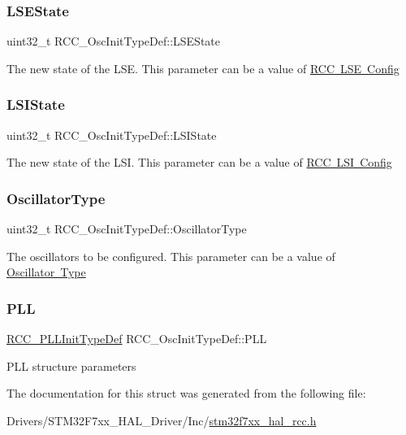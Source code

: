 \subsubsection{\texorpdfstring{LSEState}{LSEState}}
{\footnotesize\ttfamily uint32\+\_\+t R\+C\+C\+\_\+\+Osc\+Init\+Type\+Def\+::\+L\+S\+E\+State}

The new state of the L\+SE. This parameter can be a value of \mbox{\hyperlink{group___r_c_c___l_s_e___config}{R\+CC L\+SE Config}} \mbox{\label{struct_r_c_c___osc_init_type_def_a955de90db8882fde02c4fb59c7c000f0}} 
\subsubsection{\texorpdfstring{LSIState}{LSIState}}
{\footnotesize\ttfamily uint32\+\_\+t R\+C\+C\+\_\+\+Osc\+Init\+Type\+Def\+::\+L\+S\+I\+State}

The new state of the L\+SI. This parameter can be a value of \mbox{\hyperlink{group___r_c_c___l_s_i___config}{R\+CC L\+SI Config}} \mbox{\label{struct_r_c_c___osc_init_type_def_af9e7bc89cab81c1705d94c74c7a81088}} 
\subsubsection{\texorpdfstring{OscillatorType}{OscillatorType}}
{\footnotesize\ttfamily uint32\+\_\+t R\+C\+C\+\_\+\+Osc\+Init\+Type\+Def\+::\+Oscillator\+Type}

The oscillators to be configured. This parameter can be a value of \mbox{\hyperlink{group___r_c_c___oscillator___type}{Oscillator Type}} \mbox{\label{struct_r_c_c___osc_init_type_def_af76de5ee86798f0c3a4c83c84dfa58be}} 
\subsubsection{\texorpdfstring{PLL}{PLL}}
{\footnotesize\ttfamily \mbox{\hyperlink{struct_r_c_c___p_l_l_init_type_def}{R\+C\+C\+\_\+\+P\+L\+L\+Init\+Type\+Def}} R\+C\+C\+\_\+\+Osc\+Init\+Type\+Def\+::\+P\+LL}

P\+LL structure parameters 

The documentation for this struct was generated from the following file\+:\begin{DoxyCompactItemize}
\item 
Drivers/\+S\+T\+M32\+F7xx\+\_\+\+H\+A\+L\+\_\+\+Driver/\+Inc/\mbox{\hyperlink{stm32f7xx__hal__rcc_8h}{stm32f7xx\+\_\+hal\+\_\+rcc.\+h}}\end{DoxyCompactItemize}
